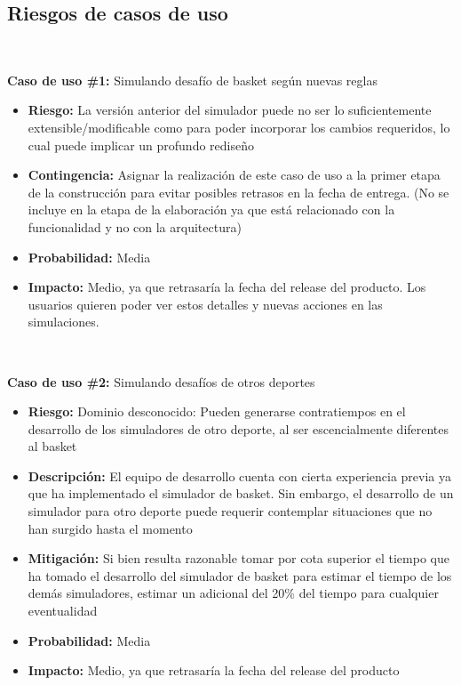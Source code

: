 \subsection{Riesgos de casos de uso}

~

\textbf{Caso de uso \#1:} Simulando desafío de basket según nuevas reglas
\begin{itemize}
\item{\textbf{Riesgo:} La versión anterior del simulador puede no ser lo suficientemente extensible/modificable como para poder incorporar los cambios requeridos, lo cual
puede implicar un profundo rediseño}
\item{\textbf{Contingencia:} Asignar la realización de este caso de uso a la primer etapa de la construcción para evitar posibles retrasos en la fecha de entrega. (No se incluye
en la etapa de la elaboración ya que está relacionado con la funcionalidad y no con la arquitectura)}
\item{\textbf{Probabilidad:} Media}
\item{\textbf{Impacto:} Medio, ya que retrasaría la fecha del release del producto. Los usuarios quieren poder ver estos detalles y nuevas acciones en las simulaciones.}
\end{itemize}

~

\textbf{Caso de uso \#2:} Simulando desafíos de otros deportes
\begin{itemize}
\item{\textbf{Riesgo:} Dominio desconocido: Pueden generarse contratiempos en el desarrollo de los simuladores de otro deporte, al ser escencialmente diferentes al basket}
\item{\textbf{Descripción:} El equipo de desarrollo cuenta con cierta experiencia previa ya que ha implementado el simulador de basket. Sin embargo, el desarrollo de
un simulador para otro deporte puede requerir contemplar situaciones que no han surgido hasta el momento}
\item{\textbf{Mitigación:} Si bien resulta razonable tomar por cota superior el tiempo que ha tomado el desarrollo del simulador de basket para estimar el tiempo de los 
demás simuladores, estimar un adicional del 20\% del tiempo para cualquier eventualidad}
\item{\textbf{Probabilidad:} Media}
\item{\textbf{Impacto:} Medio, ya que retrasaría la fecha del release del producto}
\end{itemize}

